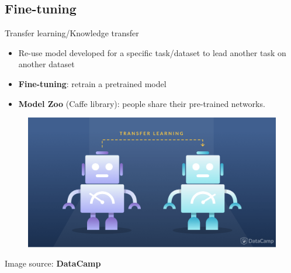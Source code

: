 \documentclass[10pt,svgnames]{beamer}
\begin{document}
\subsection{Fine-tuning}
\begin{frame}{Transfer learning/Knowledge transfer}{}
	\begin{itemize}
		\item Re-use model developed for a specific task/dataset to lead another task on another dataset
		\item \textbf{Fine-tuning}: retrain a pretrained model
		\item \textbf{Model Zoo} (Caffe library): people share their pre-trained networks.
	\end{itemize}				
	\begin{center}
     \begin{figure}[htbp]
        \includegraphics[scale=.2]{images/transfer_learning_2x}\\[-1ex]     	
	\end{figure}
  \end{center}
  {\tiny Image source: \textbf{DataCamp}}
\end{frame}
\end{document}
